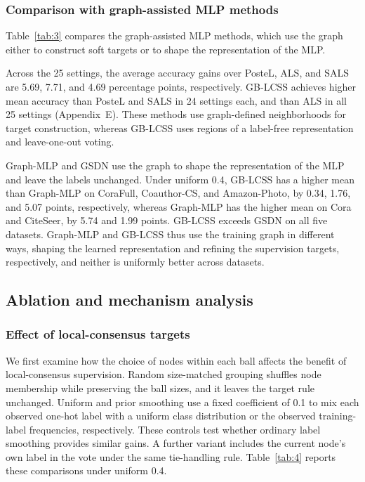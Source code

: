 \documentclass[a4paper,fleqn]{cas-sc}
\theoremstyle{definition}
\theoremstyle{plain}
\begin{document}
\subsubsection{Comparison with graph-assisted MLP methods}\label{sec:4.2.2}

Table~\ref{tab:3} compares the graph-assisted MLP methods, which use the graph either to construct soft targets or to shape the representation of the MLP.



Across the 25 settings, the average accuracy gains over PosteL, ALS, and SALS are 5.69, 7.71, and 4.69 percentage points, respectively. GB-LCSS achieves higher mean accuracy than PosteL and SALS in 24 settings each, and than ALS in all 25 settings (Appendix~E). These methods use graph-defined neighborhoods for target construction, whereas GB-LCSS uses regions of a label-free representation and leave-one-out voting.

Graph-MLP and GSDN use the graph to shape the representation of the MLP and leave the labels unchanged. Under uniform 0.4, GB-LCSS has a higher mean than Graph-MLP on CoraFull, Coauthor-CS, and Amazon-Photo, by 0.34, 1.76, and 5.07 points, respectively, whereas Graph-MLP has the higher mean on Cora and CiteSeer, by 5.74 and 1.99 points. GB-LCSS exceeds GSDN on all five datasets. Graph-MLP and GB-LCSS thus use the training graph in different ways, shaping the learned representation and refining the supervision targets, respectively, and neither is uniformly better across datasets.

\subsection{Ablation and mechanism analysis}\label{sec:4.3}

\subsubsection{Effect of local-consensus targets}\label{sec:4.3.1}

We first examine how the choice of nodes within each ball affects the benefit of local-consensus supervision. Random size-matched grouping shuffles node membership while preserving the ball sizes, and it leaves the target rule unchanged. Uniform and prior smoothing use a fixed coefficient of 0.1 to mix each observed one-hot label with a uniform class distribution or the observed training-label frequencies, respectively. These controls test whether ordinary label smoothing provides similar gains. A further variant includes the current node's own label in the vote under the same tie-handling rule. Table~\ref{tab:4} reports these comparisons under uniform 0.4.
\end{document}
